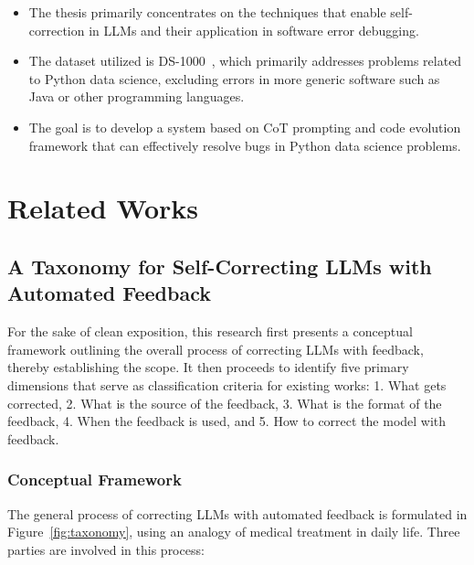 \documentclass[a4paper,oneside]{book}
\begin{document}
\begin{itemize}
  \item The thesis primarily concentrates on the techniques that enable self-correction in LLMs and their application in software error debugging.

  \item The dataset utilized is DS-1000~\cite{lai2023ds}, which primarily addresses problems related to Python data science, excluding errors in more generic software such as Java or other programming languages.

  \item The goal is to develop a system based on CoT prompting and code evolution framework that can effectively resolve bugs in Python data science problems.
\end{itemize}

\chapter{Related Works}

\section{A Taxonomy for Self-Correcting LLMs with Automated Feedback}
For the sake of clean exposition, this research first presents a conceptual framework outlining the overall process of correcting LLMs with feedback, thereby establishing the scope. It then proceeds to identify five primary dimensions that serve as classification criteria for existing works: 1. What gets corrected, 2. What is the source of the feedback, 3. What is the format of the feedback, 4. When the feedback is used, and 5. How to correct the model with feedback.

\subsection{Conceptual Framework}
The general process of correcting LLMs with automated feedback is formulated in Figure~\ref{fig:taxonomy}, using an analogy of medical treatment in daily life. Three parties are involved in this process:
\end{document}
